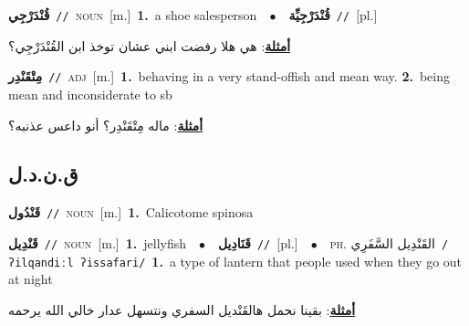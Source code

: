 \documentclass[10pt,a4paper,twoside]{article} %
\begin{document}
\begin{multicols}{2}
{\setlength\topsep{0pt}\textbf{\foreignlanguage{arabic}{قُنْدَرْجِي}}\ {\color{gray}\texttt{//}\color{black}}\ \textsc{noun}\ [m.]\ \textbf{1.}~a shoe salesperson\ \ $\bullet$\ \ \setlength\topsep{0pt}\textbf{\foreignlanguage{arabic}{قُنْدَرْجِيِّة}}\ {\color{gray}\texttt{//}\color{black}}\ [pl.]\  \begin{flushright}\color{gray}\foreignlanguage{arabic}{\textbf{\underline{\foreignlanguage{arabic}{أمثلة}}}: هي هلا رفضت ابني عشان توخذ ابن القُنْدَرْجِي؟}\end{flushright}\color{black}} \vspace{2mm}

{\setlength\topsep{0pt}\textbf{\foreignlanguage{arabic}{مِتْقَنْدِر}}\ {\color{gray}\texttt{//}\color{black}}\ \textsc{adj}\ [m.]\ \textbf{1.}~behaving in a very stand-offish and mean way.  \textbf{2.}~being mean and inconsiderate to sb\  \begin{flushright}\color{gray}\foreignlanguage{arabic}{\textbf{\underline{\foreignlanguage{arabic}{أمثلة}}}: ماله مِتْقَنْدِر؟ أنو داعس عذنبه؟}\end{flushright}\color{black}} \vspace{2mm}

\vspace{-3mm}
\subsection*{\color{blue}\foreignlanguage{arabic}{ق.ن.د.ل}\color{blue}{}} 

{\setlength\topsep{0pt}\textbf{\foreignlanguage{arabic}{قَنْدُول}}\ {\color{gray}\texttt{//}\color{black}}\ \textsc{noun}\ [m.]\ \textbf{1.}~Calicotome spinosa\ } \vspace{2mm}

{\setlength\topsep{0pt}\textbf{\foreignlanguage{arabic}{قَنْدِيل}}\ {\color{gray}\texttt{//}\color{black}}\ \textsc{noun}\ [m.]\ \textbf{1.}~jellyfish\ \ $\bullet$\ \ \setlength\topsep{0pt}\textbf{\foreignlanguage{arabic}{قَنَادِيل}}\ {\color{gray}\texttt{//}\color{black}}\ [pl.]\ \ $\bullet$\ \ \textsc{ph.} \color{gray} \foreignlanguage{arabic}{القَنْدِيل السَّفَرِي}\color{black}\ {\color{gray}\texttt{/{\sffamily ʔilqandiːl ʔissafari}/}\color{black}}\ \textbf{1.}~a type of lantern that people used when they go out at night\  \begin{flushright}\color{gray}\foreignlanguage{arabic}{\textbf{\underline{\foreignlanguage{arabic}{أمثلة}}}: بقينا نحمل هالقَنْديل السفري ونتسهل عدار خالي الله يرحمه}\end{flushright}\color{black}} \vspace{2mm}


\end{multicols}
\end{document}
